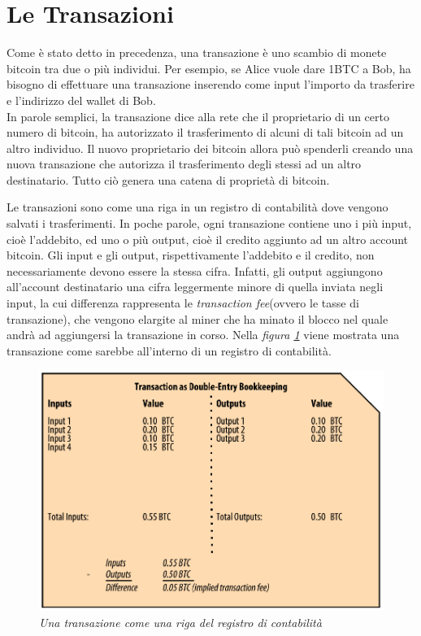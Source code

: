 \section{Le Transazioni}

Come è stato detto in precedenza, una transazione è uno scambio di monete bitcoin tra due o più individui. Per esempio, se Alice vuole dare 1BTC a Bob, ha bisogno di effettuare una transazione inserendo come input l'importo da trasferire e l'indirizzo del wallet di Bob. \\ 

In parole semplici, la transazione dice alla rete che il proprietario di un certo numero di bitcoin, ha autorizzato il trasferimento di alcuni di tali bitcoin ad un altro individuo. Il nuovo proprietario dei bitcoin allora può spenderli creando una nuova transazione che autorizza il trasferimento degli stessi ad un altro destinatario. Tutto ciò genera una catena di proprietà di bitcoin.

Le transazioni sono come una riga in un registro di contabilità dove vengono salvati i trasferimenti. In poche parole, ogni transazione contiene uno i più input, cioè l'addebito, ed uno o più output, cioè il credito aggiunto ad un altro account bitcoin. Gli input e gli output, rispettivamente l'addebito e il credito, non necessariamente devono essere la stessa cifra. Infatti, gli output aggiungono all'account destinatario una cifra leggermente minore di quella inviata negli input, la cui differenza rappresenta le \textit{transaction fee}(ovvero le tasse di transazione), che vengono elargite al miner che ha minato il blocco nel quale andrà ad aggiungersi la transazione in corso. Nella \textit{figura \ref{fig:bookkeeping}} viene mostrata una transazione come sarebbe all'interno di un registro di contabilità.
\begin{figure}[htbp]
	\centering
	\includegraphics[width=0.7 \linewidth]{figure/bookkeeping}
	\caption{\textit{Una transazione come una riga del registro di contabilità} \label{fig:bookkeeping}}
\end{figure}

